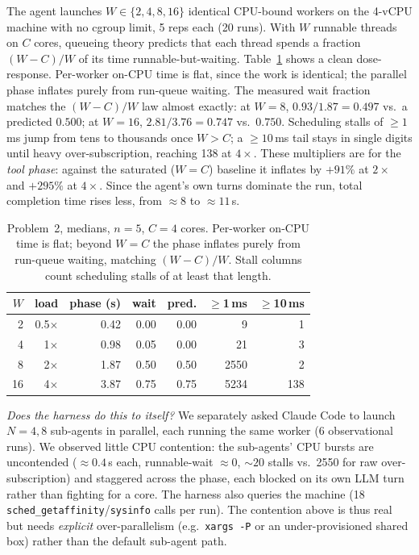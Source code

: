 \documentclass[10pt,twocolumn]{article}
\newcommand{\uu}[1]{\,\textsf{#1}}
\begin{document}
The agent launches $W \in \{2,4,8,16\}$ identical CPU-bound workers on the
4-vCPU machine with no cgroup limit, 5 reps each (20 runs). With $W$
runnable threads on $C$ cores, queueing theory predicts that each thread
spends a fraction $(W-C)/W$ of its time runnable-but-waiting.
Table~\ref{tab:threads} shows a clean dose-response. Per-worker on-CPU time
is flat, since the work is identical; the parallel phase inflates purely
from run-queue waiting. The measured wait fraction matches the $(W{-}C)/W$
law almost exactly: at $W{=}8$, $0.93/1.87=0.497$ vs.\ a predicted $0.500$;
at $W{=}16$, $2.81/3.76=0.747$ vs.\ $0.750$. Scheduling stalls of
$\ge 1$\uu{ms} jump from tens to thousands once $W>C$; a $\ge 10$\uu{ms}
tail stays in single digits until heavy over-subscription, reaching 138 at
$4\times$. These multipliers are for the \emph{tool phase}: against the
saturated ($W{=}C$) baseline it inflates by $+91\%$ at $2\times$ and
$+295\%$ at $4\times$. Since the agent's own turns dominate the run, total
completion time rises less, from ${\approx}8$ to ${\approx}11$\uu{s}.

\begin{table}[t]\centering\footnotesize
\setlength{\tabcolsep}{4pt}
\caption{Problem~2, medians, $n{=}5$, $C{=}4$ cores. Per-worker on-CPU
time is flat; beyond $W{=}C$ the phase inflates purely from run-queue
waiting, matching $(W{-}C)/W$. Stall columns count scheduling stalls of at
least that length.}
\label{tab:threads}
\begin{tabular}{@{}rrrrrrr@{}}
\toprule
$W$ & load & phase (s) & wait & pred. & $\ge$1\,ms & $\ge$10\,ms\\
\midrule
2  & 0.5$\times$ & 0.42 & 0.00 & 0.00 & 9    & 1 \\
4  & 1$\times$   & 0.98 & 0.05 & 0.00 & 21   & 3 \\
8  & 2$\times$   & 1.87 & 0.50 & 0.50 & 2550 & 2 \\
16 & 4$\times$   & 3.87 & 0.75 & 0.75 & 5234 & 138 \\
\bottomrule
\end{tabular}
\end{table}

\emph{Does the harness do this to itself?} We separately asked Claude Code
to launch $N{=}4,8$ sub-agents in parallel, each running the same worker (6
observational runs). We observed little CPU contention: the sub-agents' CPU
bursts are uncontended ($\approx\!0.4$\uu{s} each, runnable-wait
${\approx}0$, ${\sim}20$ stalls vs.\ 2550 for raw over-subscription) and
staggered across the phase, each blocked on its own LLM turn rather than
fighting for a core. The harness also queries the machine (18
\texttt{sched\_getaffinity}/\texttt{sysinfo} calls per run). The contention
above is thus real but needs \emph{explicit} over-parallelism (e.g.\
\texttt{xargs -P} or an under-provisioned shared box) rather than the
default sub-agent path.
\end{document}
